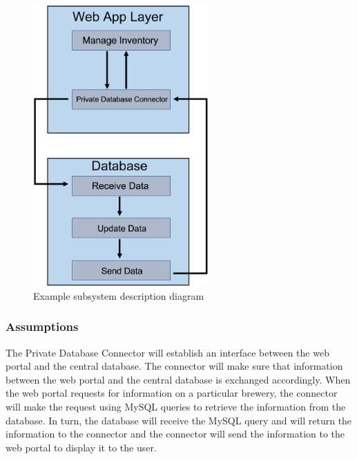 \begin{figure}[h!]
	\centering
 	\includegraphics[width=0.60\textwidth]{images/private_db_connector_subsystem.png}
 \caption{Example subsystem description diagram}
\end{figure}

\subsubsection{Assumptions}
The Private Database Connector will establish an interface between the web portal and the central database.  The connector will make sure that information between the web portal and the central database is exchanged accordingly.  When the web portal requests for information on a particular brewery, the connector will make the request using MySQL queries to retrieve the information from the database.  In turn, the database will receive the MySQL query and will return the information to the connector and the connector will send the information to the web portal to display it to the user.

